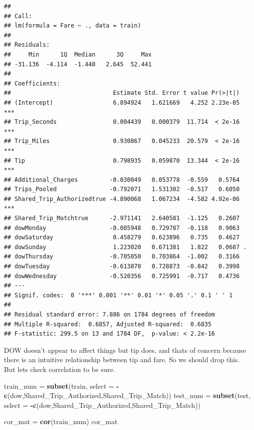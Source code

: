 \documentclass[
]{article}
\newenvironment{Shaded}{\begin{snugshade}}{\end{snugshade}}
\newcommand{\AttributeTok}[1]{\textcolor[rgb]{0.13,0.29,0.53}{#1}}
\newcommand{\FunctionTok}[1]{\textcolor[rgb]{0.13,0.29,0.53}{\textbf{#1}}}
\newcommand{\NormalTok}[1]{#1}
\newcommand{\OtherTok}[1]{\textcolor[rgb]{0.56,0.35,0.01}{#1}}
\newcommand{\SpecialCharTok}[1]{\textcolor[rgb]{0.81,0.36,0.00}{\textbf{#1}}}
\begin{document}
\begin{verbatim}
## 
## Call:
## lm(formula = Fare ~ ., data = train)
## 
## Residuals:
##     Min      1Q  Median      3Q     Max 
## -31.136  -4.114  -1.440   2.645  52.441 
## 
## Coefficients:
##                             Estimate Std. Error t value Pr(>|t|)    
## (Intercept)                 6.894924   1.621669   4.252 2.23e-05 ***
## Trip_Seconds                0.004439   0.000379  11.714  < 2e-16 ***
## Trip_Miles                  0.930867   0.045233  20.579  < 2e-16 ***
## Tip                         0.798935   0.059870  13.344  < 2e-16 ***
## Additional_Charges         -0.030049   0.053778  -0.559   0.5764    
## Trips_Pooled               -0.792071   1.531302  -0.517   0.6050    
## Shared_Trip_Authorizedtrue -4.890068   1.067234  -4.582 4.92e-06 ***
## Shared_Trip_Matchtrue      -2.971141   2.640581  -1.125   0.2607    
## dowMonday                  -0.085948   0.729787  -0.118   0.9063    
## dowSaturday                 0.458279   0.623896   0.735   0.4627    
## dowSunday                   1.223020   0.671381   1.822   0.0687 .  
## dowThursday                -0.705050   0.703864  -1.002   0.3166    
## dowTuesday                 -0.613870   0.728873  -0.842   0.3998    
## dowWednesday               -0.520356   0.725991  -0.717   0.4736    
## ---
## Signif. codes:  0 '***' 0.001 '**' 0.01 '*' 0.05 '.' 0.1 ' ' 1
## 
## Residual standard error: 7.886 on 1784 degrees of freedom
## Multiple R-squared:  0.6857, Adjusted R-squared:  0.6835 
## F-statistic: 299.5 on 13 and 1784 DF,  p-value: < 2.2e-16
\end{verbatim}

DOW doesn't appear to affect things but tip does, and thats of concern
because there is an intuitive relationship between tip and fare. So we
should drop this. But lets check correlation to be sure.

\begin{Shaded}
\begin{Highlighting}[]
\NormalTok{train\_num }\OtherTok{=} \FunctionTok{subset}\NormalTok{(train, }\AttributeTok{select =} \SpecialCharTok{{-}}\FunctionTok{c}\NormalTok{(dow,Shared\_Trip\_Authorized,Shared\_Trip\_Match))}
\NormalTok{test\_num }\OtherTok{=} \FunctionTok{subset}\NormalTok{(test, }\AttributeTok{select =} \SpecialCharTok{{-}}\FunctionTok{c}\NormalTok{(dow,Shared\_Trip\_Authorized,Shared\_Trip\_Match))}

\NormalTok{cor\_mat }\OtherTok{=} \FunctionTok{cor}\NormalTok{(train\_num)}
\NormalTok{cor\_mat}
\end{Highlighting}
\end{Shaded}
\end{document}

